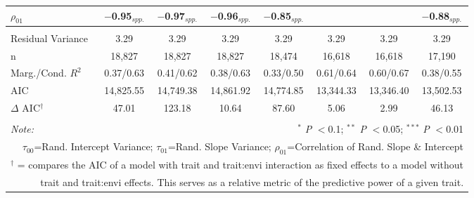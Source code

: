 \documentclass[12pt, letterpaper]{article}
\begin{document}
\begin{table}[h]
{\begin{tabular}{lccccccc}
  $\rho_{01}$ & $-$0.95$_{spp.}$ & $-$0.97$_{spp.}$ & $-$0.96$_{spp.}$ & $-$0.85$_{spp.}$ & & & $-$0.88$_{spp.}$ \\
\hline \\[-1.8ex] 
\rowcolor[gray]{.95} Residual Variance & 3.29 & 3.29 & 3.29 & 3.29 & 3.29 & 3.29 & 3.29\\
n & 18,827 & 18,827 & 18,827 & 18,474 & 16,618 & 16,618 & 17,190\\ 
\rowcolor[gray]{.95} Marg./Cond. $R^2$ & 0.37/0.63	& 0.41/0.62 &	0.38/0.63 & 0.33/0.50 & 0.61/0.64 &	0.60/0.67 & 0.38/0.55 \\
AIC   & 14,825.55 & 14,749.38 & 14,861.92 & 14,774.85 & 13,344.33 & 13,346.40 & 13,502.53 \\ 
\hline 
\rowcolor[gray]{.95}$\Delta$ AIC$^\dagger$  & 47.01 & 123.18 & 10.64 & 87.60 & 5.06 & 2.99 & 46.13  \\
\hline 
\hline \\[-1.8ex] 
\textit{Note:}  & \multicolumn{7}{r}{$^{*}$ \textit{P} $<$0.1; $^{**}$ \textit{P} $<$0.05; $^{***}$ \textit{P} $<$0.01}\\
\multicolumn{8}{r}{$\tau_{00}$=Rand. Intercept Variance; $\tau_{01}$=Rand. Slope Variance; $\rho_{01}$=Correlation of Rand. Slope \& Intercept}\\ 
\multicolumn{8}{r}{$^\dagger$ = compares the AIC of a model with trait and trait:envi interaction as fixed effects to a model without}\\
\multicolumn{8}{r}{trait and trait:envi effects. This serves as a relative metric of the predictive power of a given trait.}
\end{tabular}} 
\end{table} 
\end{document}
